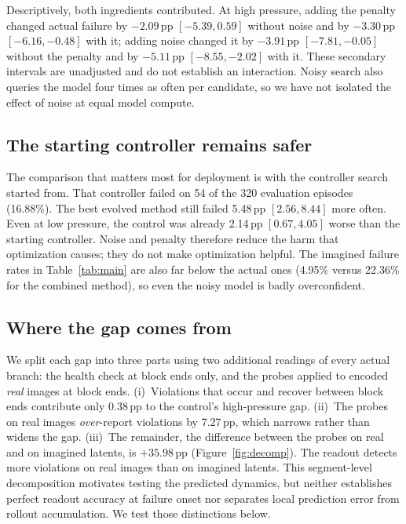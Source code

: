 \documentclass[sigconf,dvipsnames]{acmart}
\newcommand{\pp}{\,pp}
\begin{document}
Descriptively, both ingredients contributed. At high pressure, adding the
penalty changed actual failure by $-2.09$\pp{} $[-5.39, 0.59]$ without noise and
by $-3.30$\pp{} $[-6.16, -0.48]$ with it; adding noise changed it by $-3.91$\pp{}
$[-7.81, -0.05]$ without the penalty and by $-5.11$\pp{} $[-8.55, -2.02]$ with
it. These secondary intervals are unadjusted and do not establish an
interaction. Noisy search also queries the model four times as often per
candidate, so we have not isolated the effect of noise at equal model compute.

\begin{table}[t]
\caption{Outcomes at high pressure (population 256, generation 16). Imagined
failure uses each method's own noise level; the starting controller's uses
$k=0$. Evolved rates average 20 seeds on 320 shared episodes. Progress includes
post-failure motion.}
\label{tab:main}
\centering
\small

\end{table}

\subsection{The starting controller remains safer}

The comparison that matters most for deployment is with the controller search
started from. That controller failed on 54 of the 320 evaluation episodes
(16.88\%). The best evolved method still failed 5.48\pp{} $[2.56, 8.44]$ more
often. Even at low pressure, the control was already 2.14\pp{} $[0.67, 4.05]$
worse than the starting controller. Noise and penalty therefore reduce the harm
that optimization causes; they do not make optimization helpful. The imagined
failure rates in Table~\ref{tab:main} are also far below the actual ones (4.95\%
versus 22.36\% for the combined method), so even the noisy model is badly
overconfident.

\subsection{Where the gap comes from}

We split each gap into three parts using two additional readings of every
actual branch: the health check at block ends only, and the probes applied to
encoded \emph{real} images at block ends. (i)~Violations that occur and recover
between block ends contribute only 0.38\pp{} to the control's high-pressure gap.
(ii)~The probes on real images \emph{over}-report violations by 7.27\pp{}, which
narrows rather than widens the gap. (iii)~The remainder, the difference between
the probes on real and on imagined latents, is $+35.98$\pp{}
(Figure~\ref{fig:decomp}). The readout detects more
violations on real images than on imagined latents. This segment-level
decomposition motivates testing the predicted dynamics, but neither establishes
perfect readout accuracy at failure onset nor separates local prediction error
from rollout accumulation. We test those distinctions below.
\end{document}
